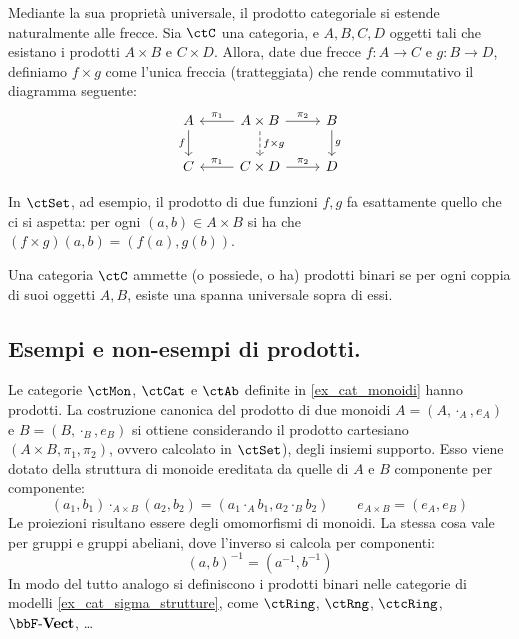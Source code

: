 \medskip
Mediante la sua proprietà universale, il prodotto categoriale si estende naturalmente alle frecce. Sia \(\ctC\) una categoria, e \(A,B,C,D\) oggetti tali che esistano i prodotti \(A\times B\) e \(C\times D\). Allora, date due frecce \(f\colon A\to C\) e \(g\colon B\to D\), definiamo \(f\times g\) come l'unica freccia (tratteggiata) che rende commutativo il diagramma seguente:
\begin{equation}
	\begin{aligned}
		\begin{tikzcd}
			A\ar[d, "f"']&A\times B\ar[l, "\pi_1"']\ar[r, "\pi_2"]\ar[d, "f\times g", dashed]&B\ar[d, "g"]
			\\
			C&C\times D\ar[l, "\pi_1"']\ar[r, "\pi_2"]&D
		\end{tikzcd}
	\end{aligned}
\end{equation}

In \(\ctSet\), ad esempio, il prodotto di due funzioni \(f,g\) fa esattamente quello che ci si aspetta: per ogni \((a,b)\in A\times B\) si ha che \((f\times g)(a,b)=(f(a),g(b))\).

\begin{definition}\label{def_cat_con_prodotti}
	Una categoria \(\ctC\) ammette (o possiede, o ha) prodotti binari se per ogni coppia di suoi oggetti \(A,B\), esiste una spanna universale sopra di essi.
\end{definition}

\subsection{Esempi e non-esempi di prodotti.}
\begin{example}
	Le categorie \(\ctMon\), \(\ctCat\) e \(\ctAb\) definite in \ref{ex_cat_monoidi} hanno prodotti. La costruzione canonica del prodotto di due monoidi \(A=(A, \cdot_A, e_A)\) e \(B=(B, \cdot_B, e_B)\)   si ottiene considerando il prodotto cartesiano \((A\times B,\pi_1, \pi_2)\), ovvero calcolato in \(\ctSet\)), degli insiemi supporto. Esso viene dotato della struttura di monoide ereditata da quelle di \(A\) e \(B\) componente per componente:
	\[
		(a_1,b_1)\cdot_{A \times B} (a_2,b_2)=(a_1\cdot_A b_1, a_2\cdot_B b_2)\qquad e_{A\times B}=(e_A,e_B)
	\]
	Le proiezioni risultano essere degli omomorfismi di monoidi.
	La stessa cosa vale per gruppi e gruppi abeliani, dove l'inverso si calcola per componenti:
	\[
		(a,b)^{-1}=(a^{-1},b^{-1})
	\]
	In modo del tutto analogo si definiscono i prodotti binari nelle categorie di modelli  \ref{ex_cat_sigma_strutture}, come \(\ctRing\), \(\ctRng\), \(\ctcRing\), \(\ctVect\), \dots
\end{example}



